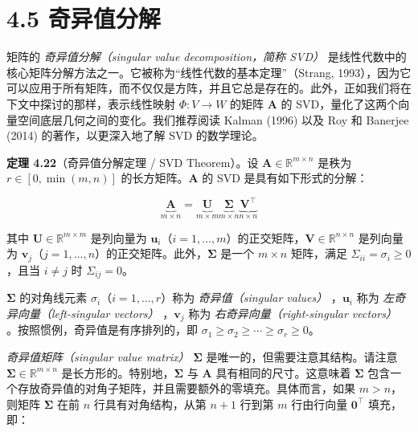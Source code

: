 \section*{4.5 奇异值分解}
\label{sec:4.5}

矩阵的 \emph{奇异值分解（singular value decomposition，简称 SVD）} 是线性代数中的核心矩阵分解方法之一。它被称为“线性代数的基本定理”（Strang, 1993），因为它可以应用于所有矩阵，而不仅仅是方阵，并且它总是存在的。此外，正如我们将在下文中探讨的那样，表示线性映射 $ \Phi : V \to W $ 的矩阵 $ \boldsymbol{A} $ 的 SVD，量化了这两个向量空间底层几何之间的变化。我们推荐阅读 Kalman (1996) 以及 Roy 和 Banerjee (2014) 的著作，以更深入地了解 SVD 的数学理论。

\textbf{定理 4.22}（奇异值分解定理 / SVD Theorem）。设 $ \boldsymbol{A} \in \mathbb{R}^{m \times n} $ 是秩为 $ r \in [0, \min(m, n)] $ 的长方矩阵。$ \boldsymbol{A} $ 的 SVD 是具有如下形式的分解：

\begin{equation}
\underbrace{\boldsymbol{A}}_{m \times n} = \underbrace{\boldsymbol{U}}_{m \times m} \underbrace{\boldsymbol{\Sigma}}_{m \times n} \underbrace{\boldsymbol{V}^\top}_{n \times n}
\tag{4.64}\label{eq:4-64}
\end{equation}

其中 $ \boldsymbol{U} \in \mathbb{R}^{m \times m} $ 是列向量为 $ \boldsymbol{u}_i $（$ i = 1, \ldots, m $）的正交矩阵，$ \boldsymbol{V} \in \mathbb{R}^{n \times n} $ 是列向量为 $ \boldsymbol{v}_j $（$ j = 1, \ldots, n $）的正交矩阵。此外，$ \boldsymbol{\Sigma} $ 是一个 $ m \times n $ 矩阵，满足 $ \Sigma_{ii} = \sigma_i \ge 0 $，且当 $ i \neq j $ 时 $ \Sigma_{ij} = 0 $。

$ \boldsymbol{\Sigma} $ 的对角线元素 $ \sigma_i $（$ i = 1, \ldots, r $）称为 \emph{奇异值（singular values）} ，$ \boldsymbol{u}_i $ 称为 \emph{左奇异向量（left-singular vectors）} ，$ \boldsymbol{v}_j $ 称为 \emph{右奇异向量（right-singular vectors）} 。按照惯例，奇异值是有序排列的，即 $ \sigma_1 \ge \sigma_2 \ge \cdots \ge \sigma_r \ge 0 $。

\emph{奇异值矩阵（singular value matrix）} $ \boldsymbol{\Sigma} $ 是唯一的，但需要注意其结构。请注意 $ \boldsymbol{\Sigma} \in \mathbb{R}^{m \times n} $ 是长方形的。特别地，$ \boldsymbol{\Sigma} $ 与 $ \boldsymbol{A} $ 具有相同的尺寸。这意味着 $ \boldsymbol{\Sigma} $ 包含一个存放奇异值的对角子矩阵，并且需要额外的零填充。具体而言，如果 $ m > n $，则矩阵 $ \boldsymbol{\Sigma} $ 在前 $ n $ 行具有对角结构，从第 $ n + 1 $ 行到第 $ m $ 行由行向量 $ \boldsymbol{0}^\top $ 填充，即：

